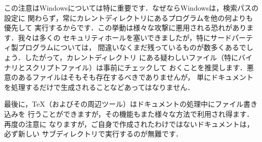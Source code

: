 \documentclass[uplatex]{jsarticle}
\begin{document}
この注意はWindowsについては特に重要です．なぜならWindowsは，検索パスの設定に
関わらず，常にカレントディレクトリにあるプログラムを他の何よりも優先して
実行するからです．この挙動は様々な攻撃に悪用される恐れがあります．我々は多くの
セキュリティホールを塞いできましたが，特にサードパーティ製プログラムについては，
間違いなくまだ残っているものが数多くあるでしょう．したがって，カレントディレクトリ
にある疑わしいファイル（特にバイナリとスクリプトファイル）は事前にチェックして
おくことを推奨します．悪意のあるファイルはそもそも存在するべきでありませんが，
単にドキュメントを処理するだけで生成されることなどあってはなりません．

最後に，\TeX （およびその周辺ツール）はドキュメントの処理中にファイル書き込みを
行うことができますが，その機能もまた様々な方法で利用され得ます．再度の注意に
なりますが，ご自身で作成されたわけではないドキュメントは，必ず新しい
サブディレクトリで実行するのが無難です．
\end{document}
